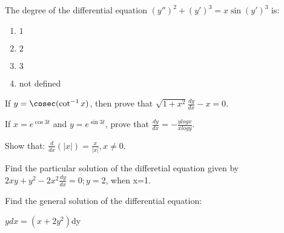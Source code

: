 	\item The degree of the differential equation $(y'')^{2} + (y')^{3} = x\sin(y')^{3}$ is:
		\begin{enumerate}
			\item $1$
			\item $2$
			\item $3$
			\item not defined
		\end{enumerate}
	\item If $y=\cosec (\cot^{-1} x)$, then prove that $\sqrt{1 + x^{2}} \frac{dy}{dx} -x = 0$.
	\item If $x=e^{\cos 3t}$ and $y=e^{\sin 3t}$, prove that $\frac{dy}{dx} = -\frac{ylogx}{xlogy}$.
	\item Show that: $\frac{d}{dx} (|x|)=\frac{x}{|x|}, x\neq0$.
	\item  Find the particular solution of the differetial equation given by $2xy + y^{2} - 2x^{2} \frac{dy}{dx} = 0; y=2$, when x=1.
	\item Find the general solution of the differential equation:\\
		\centerline {$ydx = (x + 2y^{2})$dy}

